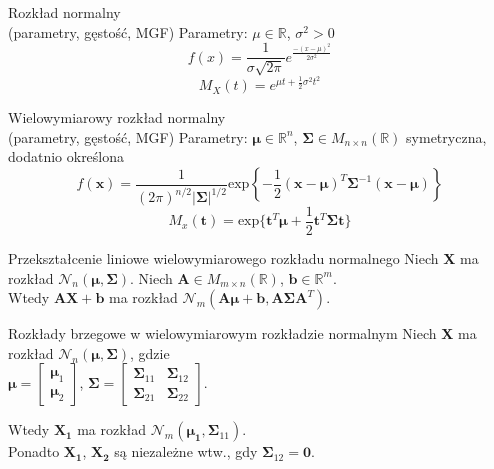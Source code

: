 \documentclass[avery5371, grid, frame]{flashcards}
\begin{document}
\begin{flashcard}[Definicja]{Rozkład normalny \\ (parametry, gęstość, MGF)}
    Parametry: $\mu \in \mathbb{R}$, $\sigma^2 > 0$
    $$ f(x) = \frac{1}{\sigma \sqrt{2\pi}} e^{\frac{-(x-\mu)^2}{2\sigma^2}} $$
    $$ M_X(t) = e^{\mu t + \frac{1}{2}\sigma^2 t^2} $$
\end{flashcard}

\begin{flashcard}[Definicja]{Wielowymiarowy rozkład normalny \\ (parametry, gęstość, MGF)}
    Parametry: $\boldsymbol{\mu} \in \mathbb{R}^n$, $\boldsymbol{\Sigma} \in M_{n \times n}(\mathbb{R})$ symetryczna, dodatnio określona
    $$ f(\mathbf{x}) = \frac{1}{(2\pi)^{n/2} |\boldsymbol{\Sigma}|^{1/2}} \text{exp} \left \{ -\frac{1}{2} (\mathbf{x} - \boldsymbol{\mu})^T \boldsymbol{\Sigma}^{-1} (\mathbf{x} - \boldsymbol{\mu}) \right \}$$
    $$M_x(\mathbf{t}) = \text{exp}\{ \mathbf{t}^T \boldsymbol{\mu} + \frac{1}{2} \mathbf{t}^T \boldsymbol{\Sigma} \boldsymbol{t}\} $$
\end{flashcard}

\begin{flashcard}[Twierdzenie]{Przekształcenie liniowe wielowymiarowego rozkładu normalnego}
    Niech \textbf{X} ma rozkład $\mathcal{N}_n (\boldsymbol{\mu}, \boldsymbol{\Sigma})$. Niech $\mathbf{A} \in M_{m \times n}(\mathbb{R})$, $\mathbf{b} \in \mathbb{R}^m$. \\
    Wtedy $\mathbf{AX} + \mathbf{b}$ ma rozkład $\mathcal{N}_m(\mathbf{A}\boldsymbol{\mu} + \mathbf{b}, \mathbf{A}\boldsymbol{\Sigma}\mathbf{A}^T)$.
\end{flashcard}

\begin{flashcard}[Twierdzenie]{Rozkłady brzegowe w wielowymiarowym rozkładzie normalnym}
    Niech \textbf{X} ma rozkład $\mathcal{N}_n (\boldsymbol{\mu}, \boldsymbol{\Sigma})$, gdzie \\
    $ \boldsymbol{\mu} =
    \left[ \begin{array}{c}
    \boldsymbol{\mu}_1 \\
    \boldsymbol{\mu}_2 \end{array} \right] $,
    $ \boldsymbol{\Sigma} =
    \left[ \begin{array}{cc}
    \boldsymbol{\Sigma}_{11} & \boldsymbol{\Sigma}_{12}\\
    \boldsymbol{\Sigma}_{21} & \boldsymbol{\Sigma}_{22} \end{array} \right] $. \newline

    Wtedy $\mathbf{X_1}$ ma rozkład $\mathcal{N}_m(\boldsymbol{\mu_1}, \boldsymbol{\Sigma}_{11})$. \\ Ponadto $\mathbf{X_1}$, $\mathbf{X_2}$ są niezależne wtw., gdy $\boldsymbol{\Sigma}_{12} = \mathbf{0}$.
\end{flashcard}
\end{document}
